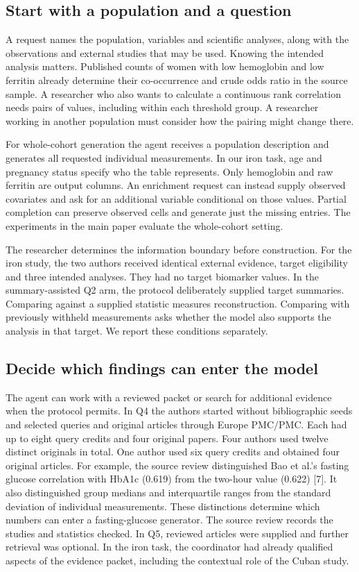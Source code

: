 \documentclass[11pt,letterpaper]{article}
\begin{document}
\subsection{Start with a population and a question}

A request names the population, variables and scientific analyses, along with the observations and external studies that may be used. Knowing the intended analysis matters. Published counts of women with low hemoglobin and low ferritin already determine their co-occurrence and crude odds ratio in the source sample. A researcher who also wants to calculate a continuous rank correlation needs pairs of values, including within each threshold group. A researcher working in another population must consider how the pairing might change there.


For whole-cohort generation the agent receives a population description and generates all requested individual measurements. In our iron task, age and pregnancy status specify who the table represents. Only hemoglobin and raw ferritin are output columns. An enrichment request can instead supply observed covariates and ask for an additional variable conditional on those values. Partial completion can preserve observed cells and generate just the missing entries. The experiments in the main paper evaluate the whole-cohort setting.


The researcher determines the information boundary before construction. For the iron study, the two authors received identical external evidence, target eligibility and three intended analyses. They had no target biomarker values. In the summary-assisted Q2 arm, the protocol deliberately supplied target summaries. Comparing against a supplied statistic measures reconstruction. Comparing with previously withheld measurements asks whether the model also supports the analysis in that target. We report these conditions separately.


\subsection{Decide which findings can enter the model}

The agent can work with a reviewed packet or search for additional evidence when the protocol permits. In Q4 the authors started without bibliographic seeds and selected queries and original articles through Europe PMC/\allowbreak{}PMC. Each had up to eight query credits and four original papers. Four authors used twelve distinct originals in total. One author used six query credits and obtained four original articles. For example, the source review distinguished Bao et al.'s fasting glucose correlation with HbA1c (0.619) from the two-hour value (0.622) [7]. It also distinguished group medians and interquartile ranges from the standard deviation of individual measurements. These distinctions determine which numbers can enter a fasting-glucose generator. The source review records the studies and statistics checked. In Q5, reviewed articles were supplied and further retrieval was optional. In the iron task, the coordinator had already qualified aspects of the evidence packet, including the contextual role of the Cuban study.
\end{document}

